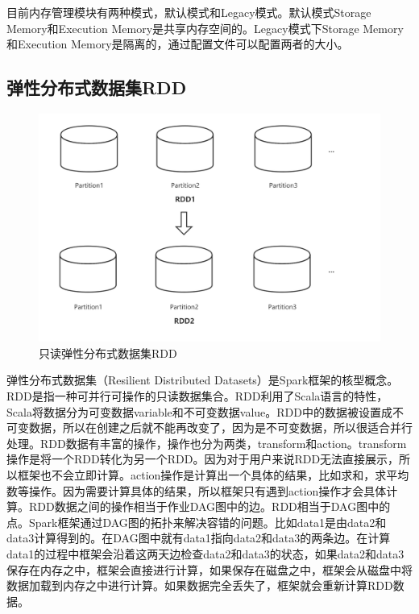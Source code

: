 目前内存管理模块有两种模式，默认模式和Legacy模式。默认模式Storage Memory和Execution Memory是共享内存空间的。Legacy模式下Storage Memory和Execution Memory是隔离的，通过配置文件可以配置两者的大小。

\subsection{弹性分布式数据集RDD}

\begin{figure}[htbp]
    \centering
    \includegraphics[width=1\textwidth]{Img/RDD示意图.png}
    \caption{只读弹性分布式数据集RDD}
    \label{fig:rdd}
\end{figure}

弹性分布式数据集（Resilient Distributed Datasets）是Spark框架的核型概念。RDD是指一种可并行可操作的只读数据集合。RDD利用了Scala语言的特性，Scala将数据分为可变数据variable和不可变数据value。RDD中的数据被设置成不可变数据，所以在创建之后就不能再改变了，因为是不可变数据，所以很适合并行处理。RDD数据有丰富的操作，操作也分为两类，transform和action。transform操作是将一个RDD转化为另一个RDD。因为对于用户来说RDD无法直接展示，所以框架也不会立即计算。action操作是计算出一个具体的结果，比如求和，求平均数等操作。因为需要计算具体的结果，所以框架只有遇到action操作才会具体计算。RDD数据之间的操作相当于作业DAG图中的边。RDD相当于DAG图中的点。Spark框架通过DAG图的拓扑来解决容错的问题。比如data1是由data2和data3计算得到的。在DAG图中就有data1指向data2和data3的两条边。在计算data1的过程中框架会沿着这两天边检查data2和data3的状态，如果data2和data3保存在内存之中，框架会直接进行计算，如果保存在磁盘之中，框架会从磁盘中将数据加载到内存之中进行计算。如果数据完全丢失了，框架就会重新计算RDD数据。

